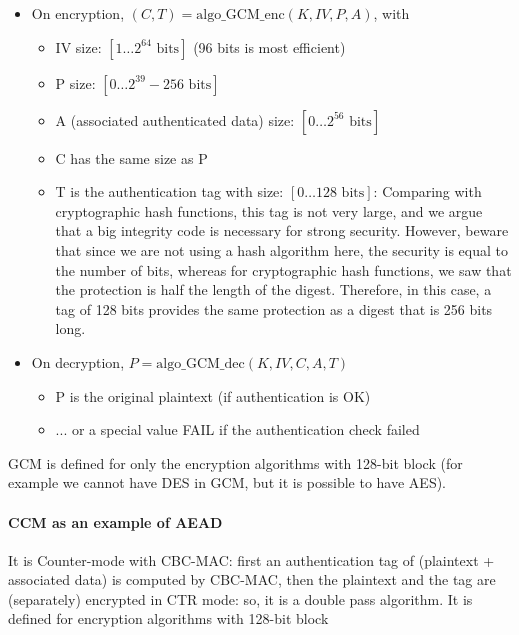 \begin{itemize}
    \item On encryption, $(C, T) = \text{algo\_GCM\_enc}(K, IV, P, A)$, with
          \begin{itemize}
              \item IV size: $[1 \ldots 2^{64} \text{ bits}]$ (96 bits is most efficient)
              \item P size: $[0 \ldots 2^{39} - 256 \text{ bits}]$
              \item A (associated authenticated data) size: $[0 \ldots 2^{56} \text{ bits}]$
              \item C has the same size as P
              \item T is the authentication tag with size: $[0 \ldots 128 \text{ bits}]$: Comparing with cryptographic hash functions, this tag is not very large, and we argue that a big integrity code is necessary for strong security. However, beware that since we are not using a hash algorithm here, the security is equal to the number of bits, whereas for cryptographic hash functions, we saw that the protection is half the length of the digest. Therefore, in this case, a tag of 128 bits provides the same protection as a digest that is 256 bits long.

          \end{itemize}
    \item On decryption, $P = \text{algo\_GCM\_dec}(K, IV, C, A, T)$
          \begin{itemize}
              \item P is the original plaintext (if authentication is OK)
              \item ... or a special value FAIL if the authentication check failed
          \end{itemize}
\end{itemize}

GCM is defined for only the encryption algorithms with 128-bit block (for example we cannot have DES in
GCM, but it is possible to have AES).

\paragraph*{CCM as an example of AEAD}
It is Counter-mode with CBC-MAC: first an authentication tag of (plaintext + associated data) is computed
by CBC-MAC, then the plaintext and the tag are (separately) encrypted in CTR mode: so, it is a double pass
algorithm. It is defined for encryption algorithms with 128-bit block


